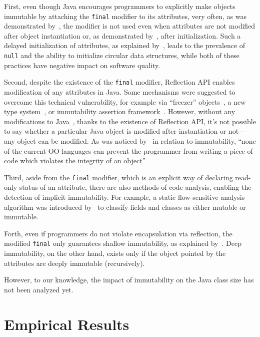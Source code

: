 \documentclass[3p,times,procedia]{elsarticle}
\begin{document}
First, even though Java encourages programmers to explicitly make objects immutable
by attaching the \texttt{final} modifier to its attributes, very often, as was
demonstrated by~\citet{unkel2008}, the modifier is not used even when
attributes are not modified after object instantiation or, as demonstrated
by~\citet{nelson2012}, after initialization. Such a delayed initialization of attributes, as
explained by~\citet{fahndrich2007}, leads to the prevalence of \texttt{null}
and the ability to initialize circular data structures, while both of these
practices have negative impact on software quality.

Second, despite the existence of the \texttt{final} modifier, Reflection API enables
modification of any attributes in Java. Some mechanisms were suggested to
overcome this technical vulnerability, for example
via ``freezer'' objects~\citep{leino2008},
a new type system~\citep{tschantz2005},
or immutability assertion framework~\citep{pechtchanski2005}.
However, without any modifications to Java~\citep{steele2005},
thanks to the existence of Reflection API,
it's not possible to say whether a particular Java object is modified
after instantiation or not---any object can be modified. As was noticed
by~\citet{hakonen1999} in relation to immutability,
``none of the current OO languages can prevent the programmer from writing
a piece of code which violates the integrity of an object''

Third, aside from the \texttt{final} modifier, which is an explicit way of declaring
read-only status of an attribute, there are also methods of
code analysis, enabling the detection of implicit immutability. For example,
a static flow-sensitive analysis algorithm was introduced by~\citet{porat2000}
to classify fields and classes as either mutable or immutable.

Forth, even if programmers do not violate encapsulation via reflection, the
modified \texttt{final} only guarantees shallow immutability, as
explained by~\citet{hakonen1999}. Deep immutability, on the other hand,
exists only if the object pointed by the attributes are deeply immutable
(recursively).

However, to our knowledge, the impact of immutability on the Java
class size has not been analyzed yet.

\section{Empirical Results}
\label{sec:results}
\end{document}
